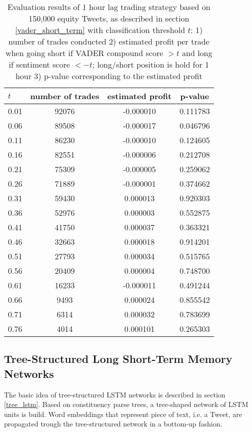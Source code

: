 \documentclass[a4paper,12pt]{article}%
\begin{document}
\begin{table}[H]
\centering
\captionsetup{justification=centering}
\begin{tabular}{l|ccc}
$t$ &  number of trades &  estimated profit & p-value\\
\hline
0.01 &        92076 &  -0.000010 &  0.111783 \\
0.06 &        89508 &  -0.000017 &  0.046796 \\
0.11 &        86230 &  -0.000010 &  0.124605 \\
0.16 &        82551 &  -0.000006 &  0.212708 \\
0.21 &        75309 &  -0.000005 &  0.259062 \\
0.26 &        71889 &  -0.000001 &  0.374662 \\
0.31 &        59430 &   0.000013 &  0.920303 \\
0.36 &        52976 &   0.000003 &  0.552875 \\
0.41 &        41750 &   0.000037 &  0.363321 \\
0.46 &        32663 &   0.000018 &  0.914201 \\
0.51 &        27793 &   0.000034 &  0.515765 \\
0.56 &        20409 &   0.000004 &  0.748700 \\
0.61 &        16233 &  -0.000011 &  0.491244 \\
0.66 &         9493 &   0.000024 &  0.855542 \\
0.71 &         6314 &   0.000032 &  0.783699 \\
0.76 &         4014 &   0.000101 &  0.265303 \\
\end{tabular}
\caption{Evaluation results of 1 hour lag trading strategy based on 150,000 equity Tweets, as described in section \ref{vader_short_term} with classification threshold $t$: 1) number of trades conducted
2) estimated profit per trade when going short if VADER compound score $>t$ and long if sentiment score $< -t$; long/short position is hold for 1 hour 3) p-value corresponding to the estimated profit\label{append_vader_short_term_1h}}
\end{table}


\subsection{Tree-Structured Long Short-Term Memory Networks}
The basic idea of tree-structured LSTM networks is described in section \ref{tree_lstm}. Based on constituency parse trees, a tree-shaped network of LSTM units is build. Word embeddings that represent piece of text, i.e. a Tweet, are propagated trough the tree-structured network in a bottom-up fashion.
\end{document}

